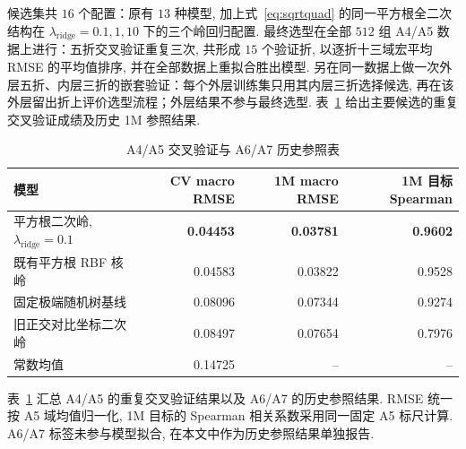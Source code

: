 候选集共 $16$ 个配置：原有 $13$ 种模型, 加上式~\eqref{eq:sqrtquad} 的同一平方根全二次结构在 $\lambda_{\mathrm{ridge}}=0.1, 1, 10$ 下的三个岭回归配置. 最终选型在全部 $512$ 组 A4/A5 数据上进行：五折交叉验证重复三次, 共形成 $15$ 个验证折, 以逐折十三域宏平均 RMSE 的平均值排序, 并在全部数据上重拟合胜出模型. 另在同一数据上做一次外层五折、内层三折的嵌套验证：每个外层训练集只用其内层三折选择候选, 再在该外层留出折上评价选型流程；外层结果不参与最终选型. 表~\ref{tab:model} 给出主要候选的重复交叉验证成绩及历史 1M 参照结果. 
\begin{table}[H]\centering\small
\caption{A4/A5 交叉验证与 A6/A7 历史参照表}\label{tab:model}
\begin{tabular}{lrrr}\toprule
模型 & CV macro RMSE & 1M macro RMSE & 1M 目标 Spearman\\\midrule
平方根二次岭, $\lambda_{\mathrm{ridge}}=0.1$ & \textbf{0.04453} & \textbf{0.03781} & \textbf{0.9602}\\
既有平方根 RBF 核岭 & 0.04583 & 0.03822 & 0.9528\\
固定极端随机树基线 & 0.08096 & 0.07344 & 0.9274\\
旧正交对比坐标二次岭 & 0.08497 & 0.07654 & 0.7976\\
常数均值 & 0.14725 & -- & --\\\bottomrule
\end{tabular}
\end{table}
表~\ref{tab:model} 汇总 A4/A5 的重复交叉验证结果以及 A6/A7 的历史参照结果. RMSE 统一按 A5 域均值归一化,  1M 目标的 Spearman 相关系数采用同一固定 A5 标尺计算. A6/A7 标签未参与模型拟合,  在本文中作为历史参照结果单独报告.

